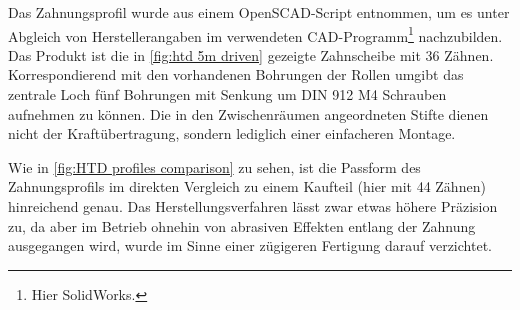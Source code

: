 		Das Zahnungsprofil wurde aus einem OpenSCAD-Script\cite{thingiverse.tooth.profiles.2012} entnommen, um es unter Abgleich von Herstellerangaben\cite{gates.catalogue.2021,GatesCorporation.drive.design.manual.2014} im verwendeten CAD-Programm\footnote{\hspace{1mm} Hier SolidWorks.} nachzubilden.
		Das Produkt ist die in \cref{fig:htd 5m driven} gezeigte Zahnscheibe mit 36 Zähnen.
		Korrespondierend mit den vorhandenen Bohrungen der Rollen umgibt das zentrale Loch fünf Bohrungen mit Senkung um DIN 912 M4 Schrauben aufnehmen zu können.
		Die in den Zwischenräumen angeordneten Stifte dienen nicht der Kraftübertragung, sondern lediglich einer einfacheren Montage.
		
		Wie in \cref{fig:HTD profiles comparison} zu sehen, ist die Passform des Zahnungsprofils im direkten Vergleich zu einem Kaufteil (hier mit 44 Zähnen) hinreichend genau.
		Das Herstellungsverfahren lässt zwar etwas höhere Präzision zu, da aber im Betrieb ohnehin von abrasiven Effekten entlang der Zahnung ausgegangen wird, wurde im Sinne einer zügigeren Fertigung darauf verzichtet.
